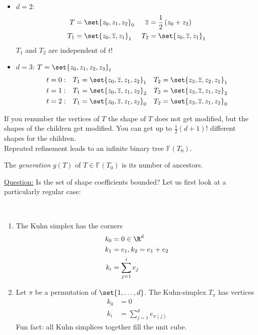 \begin{example}\
	\begin{itemize}
		\item $d=2$:
			\begin{align*}
      T &= \set{z_{0},z_{1},z_{2}}_{0} & \overline{z}&= \frac{1}{2}\left(z_{0} + z_{2} \right)\\
      T_{1} &= \set{ z_{0},\overline{z},z_{1}}_{1}  & T_{2} &= \set{z_{0},\overline{z},z_{1}}_{1}
			\end{align*}
			$T_1$ and $T_2$ are independent of $t$!
			
		\item $d= 3$: \quad $T = \set{ z_{0},z_{1},z_{2},z_{3} }_{t}$
      \begin{align*}
        t&=0: & T_{1}&= \set{ z_{0},\overline{z}, z_{1},z_{2}}_{1} & T_{2}&= \set{z_{3},\overline{z}, z_{2},z_{1}}_{1}\\
        t&=1: & T_{1}&= \set{z_{0},\overline{z}, z_{1},z_{2}}_{2} & T_{2}&= \set{z_{3},\overline{z}, z_{1},z_{2} }_{2}\\
        t&=2: & T_{1}&= \set{ z_{0},\overline{z}, z_{1},z_{2} }_{0} & T_{2}&= \set{ z_{3},\overline{z}, z_{1},z_{2} }_{0}
			\end{align*}
	\end{itemize}
\end{example}
If you renumber the vertices of $T$ the shape of $T$ does not get modified, but the shapes of the children get modified. You can get up to $\frac{1}{2}\left(d+1 \right)!$ different shapes for the children.\\
Repeated refinement leads to an infinite binary tree $\mathbb{F}(T_{0})$.
\begin{definition}
	The \textit{generation} $g(T)$ of $T \in \mathbb{F}(T_{0})$ is its number of ancestors.
\end{definition}
\underline{Question:} Is the set of shape coefficients bounded?\nl
Let us first look at a particularly regular case:
\begin{definition}\
	\begin{enumerate}[label = \Roman*)]
		\item The Kuhn simplex has the corners
			\begin{align*}
				k_{0}&=0 \in \R^d\\
				k_{1}&=e_{1}, k_{2}=e_1 + e_{2}\\
				k_{i}&= \sum_{j=1}^{i} e_{j}
			\end{align*}
			
		\item Let $\pi$ be a permutation of $\set{1,\dots ,d }$. The Kuhn-simplex $T_{\pi}$ has vertices
			\begin{align*}
				k_{0}&=0 \\
				k_{i}&= \sum_{j=1}^{d} e_{\pi(j)}
			\end{align*}		
      Fun fact: all Kuhn simplices together fill the unit cube.
	\end{enumerate}
\end{definition}

